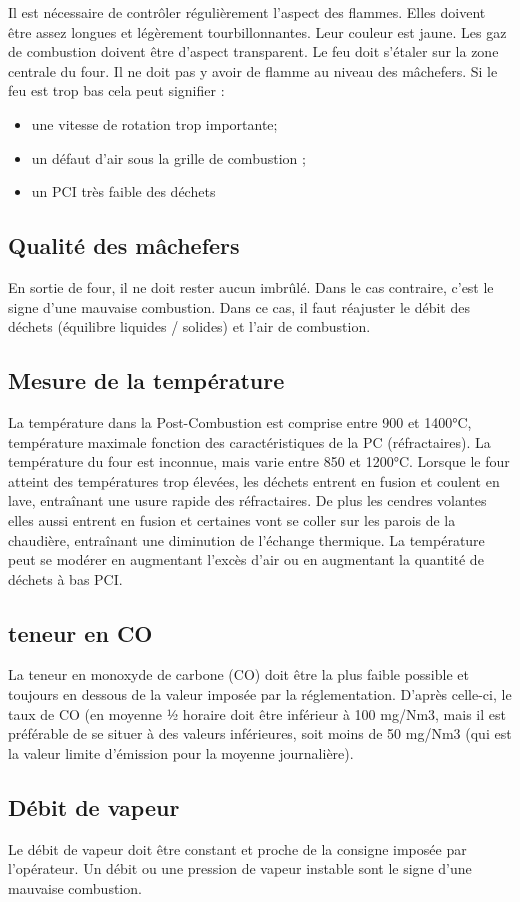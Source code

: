 Il est nécessaire de contrôler régulièrement l’aspect des flammes. Elles doivent être assez longues et légèrement tourbillonnantes. Leur couleur est jaune. Les gaz de combustion doivent être d’aspect transparent.
Le feu doit s’étaler sur la zone centrale du four. Il ne doit pas y avoir de flamme au niveau des mâchefers.
Si le feu est trop bas cela peut signifier :

\begin{itemize}

\item une vitesse de rotation trop importante;
\item un défaut d’air sous la grille de combustion ;
\item un PCI très faible des déchets
  
\end{itemize}

\subsection{Qualité des mâchefers}


En sortie de four, il ne doit rester aucun imbrûlé. Dans le cas contraire, c’est le signe d’une mauvaise combustion. Dans ce cas, il faut réajuster le débit des déchets (équilibre liquides / solides) et l’air de combustion.


\subsection{Mesure de la température} 

La température dans la Post-Combustion est comprise entre 900 et 1400°C, température maximale fonction des caractéristiques de la PC (réfractaires).
La température du four est inconnue, mais varie entre 850 et 1200°C.
Lorsque le four atteint des températures trop élevées, les déchets entrent en fusion et coulent en lave, entraînant une usure rapide des réfractaires. De plus les cendres volantes elles aussi entrent en fusion et certaines vont se coller sur les parois de la chaudière, entraînant une diminution de l’échange thermique.
La température peut se modérer en augmentant l’excès d’air ou en augmentant la quantité de déchets à bas PCI.


\subsection{teneur en CO}

La teneur en monoxyde de carbone (CO) doit être la plus faible possible et toujours en dessous de la valeur imposée par la réglementation. D’après celle-ci, le taux de CO (en moyenne ½ horaire doit être inférieur à 100 mg/Nm3, mais il est préférable de se situer à des valeurs inférieures, soit moins de 50 mg/Nm3 (qui est la valeur limite d’émission pour la moyenne journalière).



\subsection{Débit de vapeur}

Le débit de vapeur doit être constant et proche de la consigne imposée par l’opérateur. 
Un débit ou une pression de vapeur instable sont le signe d’une mauvaise combustion.



